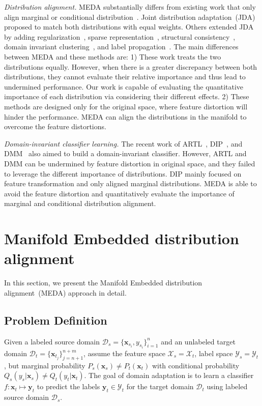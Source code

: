 \documentclass[sigconf]{acmart}
\begin{document}
\textit{Distribution alignment.} MEDA substantially differs from existing work that only align marginal or conditional distribution~\cite{pan2011domain}. Joint distribution adaptation~(JDA)~\cite{long2013transfer} proposed to match both distributions with equal weights. Others extended JDA by adding regularization~\cite{long2014adaptation}, sparse representation~\cite{xu2016discriminative}, structural consistency~\cite{hou2016unsupervised}, domain invariant clustering~\cite{tahmoresnezhad2016visual}, and label propagation~\cite{zhang2017joint}. The main differences between MEDA and these methods are: 1) These work treats the two distributions equally. However, when there is a greater discrepancy between both distributions, they cannot evaluate their relative importance and thus lead to undermined performance. Our work is capable of evaluating the quantitative importance of each distribution via considering their different effects. 2) These methods are designed only for the original space, where feature distortion will hinder the performance. MEDA can align the distributions in the manifold to overcome the feature distortions.

\textit{Domain-invariant classifier learning.} The recent work of ARTL~\cite{long2014adaptation}, DIP~\cite{baktashmotlagh2013unsupervised,baktashmotlagh2016distribution}, and DMM~\cite{cao2018unsupervised} also aimed to build a domain-invariant classifier. However, ARTL and DMM can be undermined by feature distortion in original space, and they failed to leverage the different importance of distributions. DIP mainly focused on feature transformation and only aligned marginal distributions. MEDA is able to avoid the feature distortion and quantitatively evaluate the importance of marginal and conditional distribution alignment.


\section{Manifold Embedded distribution alignment}
\label{sec-method}

In this section, we present the Manifold Embedded distribution alignment~(MEDA) approach in detail.

\subsection{Problem Definition}
Given a labeled source domain $\mathcal{D}_s=\{\mathbf{x}_{s_i},y_{s_i}\}^n_{i=1}$ and an unlabeled target domain $\mathcal{D}_t=\{\mathbf{x}_{t_j}\}^{n+m}_{j=n+1}$, assume the feature space $\mathcal{X}_s = \mathcal{X}_t$, label space $\mathcal{Y}_s = \mathcal{Y}_t$, but marginal probability $P_s(\mathbf{x}_s) \ne P_t(\mathbf{x}_t)$ with conditional probability $Q_s(y_s|\mathbf{x}_s) \ne Q_t(y_t|\mathbf{x}_t)$. The goal of domain adaptation is to learn a classifier $f:\mathbf{x}_t \mapsto \mathbf{y}_t$ to predict the labels $\mathbf{y}_t \in \mathcal{Y}_t$ for the target domain $\mathcal{D}_t$ using labeled source domain $\mathcal{D}_s$.
\end{document}

